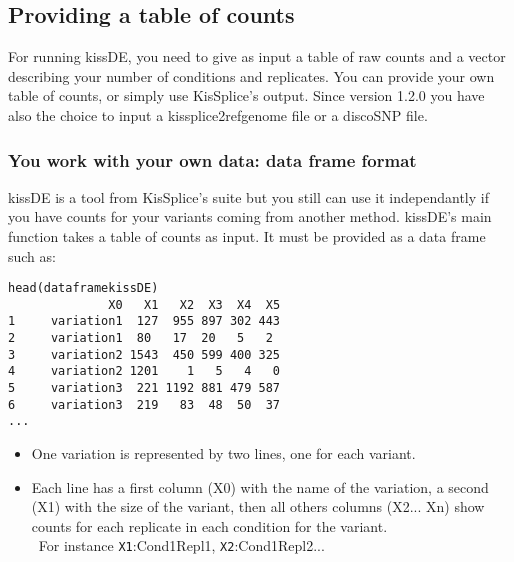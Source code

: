 \documentclass[english, a4paper, 12pt]{article}
\begin{document}

\subsection{Providing a table of counts}
For running kissDE, you need to give as input a table of raw counts and a vector describing your number of conditions and replicates.
You can provide your own table of counts, or simply use KisSplice's output. Since version 1.2.0 you have also the choice to 
input a kissplice2refgenome file or a discoSNP file.



\subsubsection{You work with your own data: data frame format}
kissDE is a tool from KisSplice's suite but you still can use it independantly if you have counts for your variants coming from another method. kissDE's main function takes a table of counts as input. It must be provided as a data frame such as:\\
\begin{verbatim}
head(dataframekissDE)
              X0   X1   X2  X3  X4  X5
1     variation1  127  955 897 302 443
2     variation1  80   17  20   5   2
3     variation2 1543  450 599 400 325
4     variation2 1201    1   5   4   0
5     variation3  221 1192 881 479 587
6     variation3  219   83  48  50  37
...
\end{verbatim}
\begin{itemize}
 \item One variation is represented by two lines, one for each variant.
 \item Each line has a first column (X0) with the name of the variation, a second (X1) with the size of the variant, then all others columns (X2... Xn) show counts for each replicate in each condition for the variant.\\
 For instance \verb|X1|:Cond1Repl1, \verb|X2|:Cond1Repl2...
\end{itemize}
\end{document}
